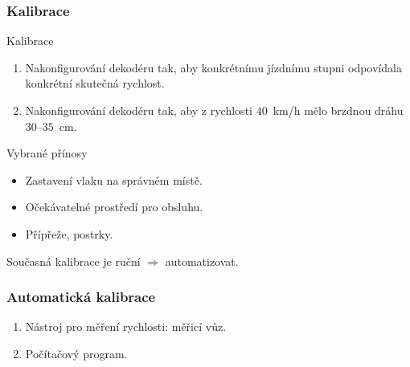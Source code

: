 \documentclass[aspectratio=169]{beamer}
\begin{document}

\begin{frame}
\frametitle{Kalibrace}
\begin{block}{Kalibrace}
\begin{enumerate}
\item Nakonfigurování dekodéru tak, aby konkrétnímu jízdnímu stupni odpovídala
konkrétní skutečná rychlost.
\item Nakonfigurování dekodéru tak, aby z rychlosti $40$~km/h mělo brzdnou dráhu
$30$--$35$~cm.
\end{enumerate}
\end{block}

\pause

\begin{block}{Vybrané přínosy}
\begin{itemize}
\item Zastavení vlaku na správném místě.
\item Očekávatelné prostředí pro obsluhu.
\item Přípřeže, postrky.
\end{itemize}
\end{block}

Současná kalibrace je ruční $\Rightarrow$ automatizovat.
\end{frame}


\begin{frame}
\frametitle{Automatická kalibrace}
\begin{enumerate}
\item Nástroj pro měření rychlosti: měřicí vůz.
\item Počítačový program.
\end{enumerate}
\end{frame}

\end{document}

